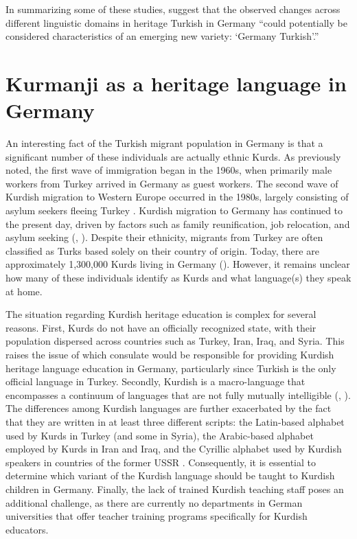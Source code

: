 \newpage
In summarizing some of these studies, \citet[34]{KuppersEtAl2015} suggest that the observed changes across different linguistic domains in heritage Turkish in Germany “could potentially be considered characteristics of an emerging new variety: ‘Germany Turkish’.”

\section{Kurmanji as a heritage language in Germany}\label{sec:key:2.2}

An interesting fact of the Turkish migrant population in Germany is that a significant number of these individuals are actually ethnic Kurds. As previously noted, the first wave of immigration began in the 1960s, when primarily male workers from Turkey arrived in Germany as guest workers. The second wave of Kurdish migration to Western Europe occurred in the 1980s, largely consisting of asylum seekers fleeing Turkey \citep{Ostergaardnielsen2001}. Kurdish migration to Germany has continued to the present day, driven by factors such as family reunification, job relocation, and asylum seeking (\citealt{DemmrichArakon2021}, \citealt{Mcgee2018}). Despite their ethnicity, migrants from Turkey are often classified as Turks based solely on their country of origin. Today, there are approximately 1,300,000 Kurds living in Germany (\citealt{GhaderiAlmstadt2023}). However, it remains unclear how many of these individuals identify as Kurds and what language(s) they speak at home.

The situation regarding Kurdish heritage education is complex for several reasons. First, Kurds do not have an officially recognized state, with their population dispersed across countries such as Turkey, Iran, Iraq, and Syria. This raises the issue of which consulate would be responsible for providing Kurdish heritage language education in Germany, particularly since Turkish is the only official language in Turkey. Secondly, Kurdish is a macro-language that encompasses a continuum of languages that are not fully mutually intelligible (\citealt{Hassanpour1992}, \citealt{Sheyholislami2015}). The differences among Kurdish languages are further exacerbated by the fact that they are written in at least three different scripts: the Latin-based alphabet used by Kurds in Turkey (and some in Syria), the Arabic-based alphabet employed by Kurds in Iran and Iraq, and the Cyrillic alphabet used by Kurdish speakers in countries of the former USSR \citep{Sheyholislami2009}. Consequently, it is essential to determine which variant of the Kurdish language should be taught to Kurdish children in Germany. Finally, the lack of trained Kurdish teaching staff poses an additional challenge, as there are currently no departments in German universities that offer teacher training programs specifically for Kurdish educators.


